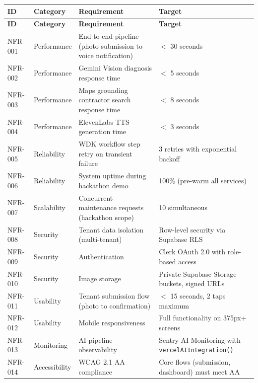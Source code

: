 \documentclass[12pt,a4paper]{article}
\begin{document}
\begin{longtable}{L{1.5cm} L{2.5cm} L{5.5cm} L{3.5cm}}
\toprule
\textbf{ID} & \textbf{Category} & \textbf{Requirement} & \textbf{Target} \\
\midrule
\endfirsthead
\toprule
\textbf{ID} & \textbf{Category} & \textbf{Requirement} & \textbf{Target} \\
\midrule
\endhead
\bottomrule
\endfoot
NFR-001 & Performance & End-to-end pipeline (photo submission to voice notification) & $<$ 30 seconds \\
\midrule
NFR-002 & Performance & Gemini Vision diagnosis response time & $<$ 5 seconds \\
\midrule
NFR-003 & Performance & Maps grounding contractor search response time & $<$ 8 seconds \\
\midrule
NFR-004 & Performance & ElevenLabs TTS generation time & $<$ 3 seconds \\
\midrule
NFR-005 & Reliability & WDK workflow step retry on transient failure & 3 retries with exponential backoff \\
\midrule
NFR-006 & Reliability & System uptime during hackathon demo & 100\% (pre-warm all services) \\
\midrule
NFR-007 & Scalability & Concurrent maintenance requests (hackathon scope) & 10 simultaneous \\
\midrule
NFR-008 & Security & Tenant data isolation (multi-tenant) & Row-level security via Supabase RLS \\
\midrule
NFR-009 & Security & Authentication & Clerk OAuth 2.0 with role-based access \\
\midrule
NFR-010 & Security & Image storage & Private Supabase Storage buckets, signed URLs \\
\midrule
NFR-011 & Usability & Tenant submission flow (photo to confirmation) & $<$ 15 seconds, 2 taps maximum \\
\midrule
NFR-012 & Usability & Mobile responsiveness & Full functionality on 375px+ screens \\
\midrule
NFR-013 & Monitoring & AI pipeline observability & Sentry AI Monitoring with \texttt{vercelAIIntegration()} \\
\midrule
NFR-014 & Accessibility & WCAG 2.1 AA compliance & Core flows (submission, dashboard) must meet AA \\
\end{longtable}

\end{document}
